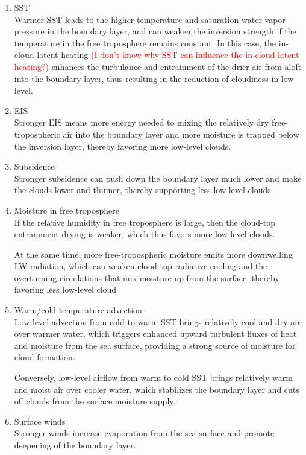 \begin{enumerate}[label={(\arabic*)}]
    \item SST \\
    Warmer SST leads to the higher temperature and saturation water vapor pressure in the boundary layer, and can weaken the inversion strength if the temperature in the free troposphere remains constant. In this case, the in-cloud latent heating 
    \textcolor{red}{(I don't know why SST can influence the in-cloud latent heating?)} enhances the turbulance and entrainment of the drier air from aloft into the boundary layer, thus resulting in the reduction of cloudiness in low level.
    
    \item EIS \\
    Stronger EIS means more energy needed to mixing the relatively dry free-tropospheric air into the boundary layer and more moisture is trapped below the inversion layer, thereby favoring more low-level clouds.
    
    \item Subsidence \\
    Stronger subsidence can push down the boundary layer much lower and make the clouds lower and thinner, thereby supporting less low-level clouds.
    
    \item Moisture in free troposphere \\
    If the relative humidity in free troposphere is large, then the cloud-top entrainment drying is weaker, which thus favors more low-level clouds.
    
    
    At the same time, more free-tropospheric moisture emits more downwelling LW radiation, which can weaken cloud-top radiative-cooling and the overturning circulations that mix moisture up from the surface, thereby favoring less low-level cloud
    
    
    \item Warm/cold temperature advection\\
    Low-level advection from cold to warm SST brings relatively cool and dry air over warmer water, which triggers enhanced upward turbulent fluxes of heat and moisture from the sea surface, providing a strong source of moisture for cloud formation.
    
    Conversely, low-level airflow from warm to cold SST brings relatively warm and moist air over cooler water, which stabilizes the boundary layer and cuts off clouds from the surface moisture supply. 
    
    \item Surface winds\\
    Stronger winds increase evaporation from the sea surface and promote deepening of the boundary layer.
    
\end{enumerate}


